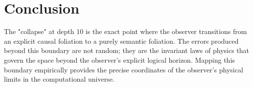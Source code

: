\documentclass[12pt,a4paper]{article}
\begin{document}
\section{Conclusion}

The "collapse" at depth 10 is the exact point where the observer transitions from an explicit causal foliation to a purely semantic foliation. The errors produced beyond this boundary are not random; they are the invariant laws of physics that govern the space beyond the observer's explicit logical horizon. Mapping this boundary empirically provides the precise coordinates of the observer's physical limits in the computational universe.
\end{document}
